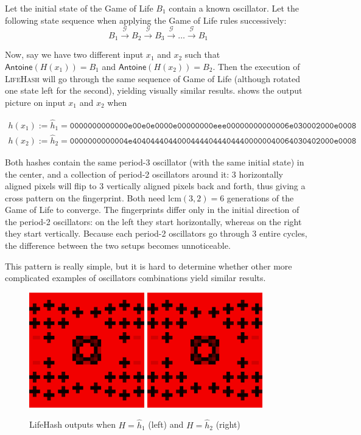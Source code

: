\documentclass{article}
\begin{document}
Let the initial state of the Game of Life $B_1$ contain a known oscillator. Let the following state sequence when applying the Game of Life rules successively: $$B_1 \xrightarrow{\mathcal G} B_2 \xrightarrow{\mathcal G}B_3 \xrightarrow{\mathcal G} \dots \xrightarrow{\mathcal{G}} B_1$$

Now, say we have two different input $x_1$ and $x_2$ such that $\mathsf{Antoine}(H(x_1)) = B_1$ and $\mathsf{Antoine}(H(x_2)) = B_2$. Then the execution of \textsc{LifeHash} will go through the same sequence of Game of Life (although rotated one state left for the second), yielding visually similar results.  shows the output picture on input $x_1$ and $x_2$ when 

\begin{align*}
h(x_1) := \hat{h}_1 =\texttt{0000000000000e00e0e0000e00000000eee00000000000006e030002000e0008} \\
h(x_2) := \hat{h}_2 =\texttt{0000000000004e404044404400044440444044400000040064030402000e0008}
\end{align*}

Both hashes contain the same period-3 oscillator (with the same initial state) in the center, and a collection of period-2 oscillators around it: 3 horizontally aligned pixels will flip to 3 vertically aligned pixels back and forth, thus giving a cross pattern on the fingerprint. Both need lcm$(3,2) = 6$ generations of the Game of Life to converge. The fingerprints differ only in the initial direction of the period-2 oscillators: on the left they start horizontally, whereas on the right they start vertically. Because each period-2 oscillators go through 3 entire cycles, the difference between the two setups becomes unnoticeable. 

This pattern is really simple, but it is hard to determine whether other more complicated examples of oscillators combinations yield similar results.


\begin{figure}
    \centering
    \includegraphics[width=5cm]{figures/ee3.png}
    \includegraphics[width=5cm]{figures/443.png}
    \caption{LifeHash outputs when $H = \hat{h}_1$ (left) and $H = \hat{h}_2$ (right)}
    \label{fig:lifehash}
\end{figure}
\end{document}

